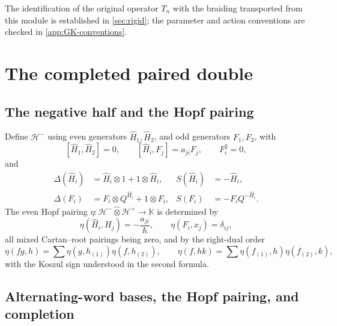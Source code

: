\documentclass[11pt,a4paper]{article}
\newcommand{\hK}{\mathbb K}
\newcommand{\ot}{\otimes}
\newcommand{\hot}{\widehat\otimes}
\theoremstyle{definition}
\theoremstyle{remark}
\begin{document}
The identification of the original operator \(T_n\) with the braiding
transported from this module is established in \cref{sec:rigid}; the
parameter and action conventions are checked in \cref{app:GK-conventions}.

\section{The completed paired double}\label{sec:double}

\subsection{The negative half and the Hopf pairing}

Define
\(\mathcal H^-\) using even generators \(\widehat H_1,\widehat H_2\),
and odd generators \(F_1,F_2\), with
\[
 [\widehat H_1,\widehat H_2]=0,\qquad
 [\widehat H_i,F_j]=a_{ji}F_j,\qquad F_i^2=0,
\]
and
\begin{equation}\label{eq:negative-Hopf}
\begin{aligned}
 \Delta(\widehat H_i)&=\widehat H_i\ot1+1\ot\widehat H_i,&
 S(\widehat H_i)&=-\widehat H_i,\\
 \Delta(F_i)&=F_i\ot Q^{\widehat H_i}+1\ot F_i,&
 S(F_i)&=-F_iQ^{-\widehat H_i}.
\end{aligned}
\end{equation}
The even Hopf pairing
\(\eta:\mathcal H^-\hot\mathcal H^+\to\hK\) is determined by
\begin{equation}\label{eq:eta-generators}
 \eta(\widehat H_i,H_j)=-\frac{a_{ji}}{\hbar},
 \qquad
 \eta(F_i,x_j)=\delta_{ij},
\end{equation}
all mixed Cartan--root pairings being zero, and by the right-dual order
\begin{equation}\label{eq:eta-extension}
\eta(fg,h)=\sum\eta(g,h_{(1)})\eta(f,h_{(2)}),\qquad
\eta(f,hk)=\sum\eta(f_{(1)},h)\eta(f_{(2)},k),
\end{equation}
with the Koszul sign understood in the second formula.

\subsection{Alternating-word bases, the Hopf pairing, and completion}\label{sec:completion}
\end{document}
